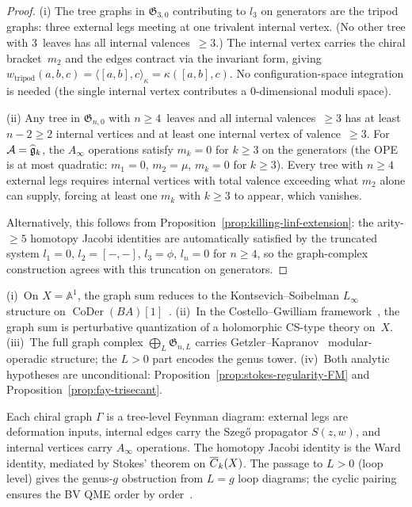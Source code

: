 \begin{proof}
(i)\enspace
The tree graphs in $\mathfrak{G}_{3,0}$ contributing to $l_3$ on
generators are the tripod graphs: three external legs
meeting at one trivalent internal vertex.  (No other tree with
$3$~leaves has all internal valences~$\geq 3$.)
The internal vertex carries the chiral bracket~$m_2$ and the
edges contract via the invariant form, giving
$w_{\text{tripod}}(a,b,c) = \langle [a,b], c \rangle_\kappa
= \kappa([a,b],c)$.
No configuration-space integration is needed (the single internal
vertex contributes a $0$-dimensional moduli space).

(ii)\enspace
Any tree in $\mathfrak{G}_{n,0}$ with $n \geq 4$~leaves
and all internal valences~$\geq 3$ has at least $n - 2 \geq 2$
internal vertices and at least one internal vertex of
valence~$\geq 3$.  For
$\mathcal{A} = \widehat{\mathfrak{g}}_k$, the $A_\infty$ operations
satisfy $m_k = 0$ for $k \geq 3$ on the generators (the OPE is at
most quadratic: $m_1 = 0$, $m_2 = \mu$, $m_k = 0$ for
$k \geq 3$).  Every tree with $n \geq 4$ external legs requires
internal vertices with total valence exceeding what $m_2$ alone can
supply, forcing at least one $m_k$ with $k \geq 3$ to appear, which
vanishes.

Alternatively, this follows from
Proposition~\ref{prop:killing-linf-extension}: the arity-$\geq 5$
homotopy Jacobi identities are automatically satisfied by the
truncated system $l_1 = 0$, $l_2 = [-,-]$, $l_3 = \phi$,
$l_n = 0$ for $n \geq 4$, so the graph-complex construction
agrees with this truncation on generators.
\end{proof}

\begin{remark}
\label{rem:graph-complex-context}
(i)~On $X = \mathbb{A}^1$, the graph sum reduces to the
Kontsevich--Soibelman $L_\infty$ structure on
$\operatorname{CoDer}(BA)[1]$~\cite{KontsevichSoibelman}.
(ii)~In the Costello--Gwilliam framework~\cite{CG17,CG-vol2}, the
graph sum is perturbative quantization of a holomorphic CS-type
theory on~$X$.
(iii)~The full graph complex
$\bigoplus_L \mathfrak{G}_{n,L}$ carries
Getzler--Kapranov~\cite{GeK98} modular-operadic structure; the
$L > 0$ part encodes the genus tower.
(iv)~Both analytic hypotheses are unconditional:
Proposition~\ref{prop:stokes-regularity-FM} and
Proposition~\ref{prop:fay-trisecant}.
\end{remark}

\begin{remark}\label{rem:graph-complex-physics}
Each chiral graph $\Gamma$ is a tree-level Feynman diagram: external
legs are deformation inputs, internal edges carry the Szeg\H{o}
propagator $S(z,w)$, and internal vertices carry $A_\infty$
operations.  The homotopy Jacobi identity is the Ward identity,
mediated by Stokes' theorem on $\overline{C}_{k}(X)$.  The passage to
$L > 0$ (loop level) gives the genus-$g$ obstruction from $L = g$
loop diagrams; the cyclic pairing ensures the BV QME order by
order~\cite{costello-renormalization}.
\end{remark}

